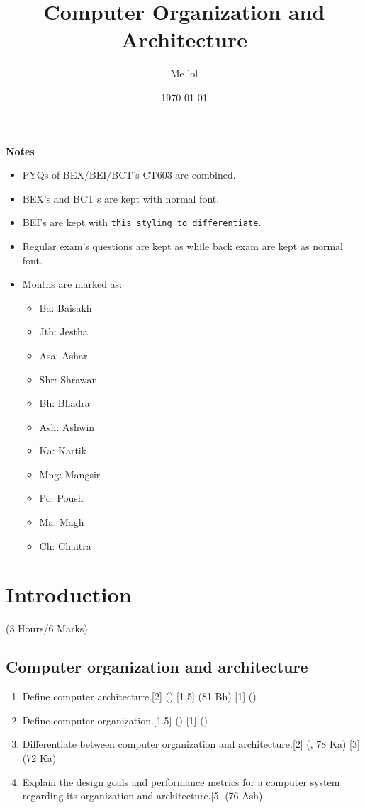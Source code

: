 \documentclass[12pt]{article}
\title{Computer Organization and Architecture}
\author{Me lol}
\date{\today}
\begin{document}
\maketitle

\vspace{13cm}
\begin{large}\textbf{Notes}\end{large}
\begin{itemize}
\item PYQs of BEX/BEI/BCT's CT603 are combined.
\item BEX's and BCT's are kept with normal font.\item BEI's are kept with \texttt{this styling to differentiate}.
\item Regular exam's questions are kept as  while back exam are kept as normal font.
\item Months are marked as: 
\begin{itemize}[noitemsep]
	\item Ba: Baisakh
	\item Jth: Jestha
	\item Asa: Ashar
	\item Shr: Shrawan
	\item Bh: Bhadra
	\item Ash: Ashwin
	\item Ka: Kartik
	\item Mng: Mangsir
	\item Po: Poush
	\item Ma: Magh
	\item Ch: Chaitra
\end{itemize}
\end{itemize}
\pagebreak

\tableofcontents
\pagebreak

\section{Introduction}
	\begin{center}(3 Hours/6 Marks)\end{center}
	\subsection{Computer organization and architecture}
	\begin{enumerate}[noitemsep, topsep = 0pt]
	\item Define computer architecture.\hfill[2] () [1.5] (81 Bh) [1] ()
	\item Define computer organization.\hfill[1.5] () [1] ()
	\item Differentiate between computer organization and architecture.\hfill[2] (, 78 Ka) [3] (72 Ka)
	\item Explain the design goals and performance metrics for a computer system regarding its organization and architecture.\hspace{9.9cm}[5] (76 Ash)
	\end{enumerate}
\end{document}
